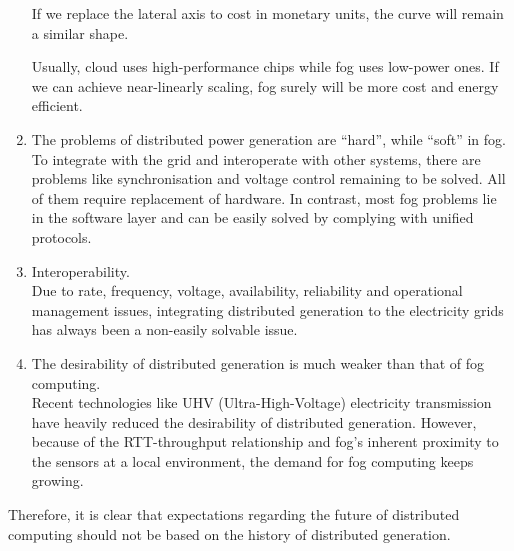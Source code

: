 \begin{enumerate}
	If we replace the lateral axis to cost in monetary units, the curve will remain a similar shape. 
	
	Usually, cloud uses high-performance chips while fog uses low-power ones. If we can achieve near-linearly scaling, fog surely will be more cost and energy efficient. 
	
	\item The problems of distributed power generation are ``hard'', while ``soft'' in fog.\\
	To integrate with the grid and interoperate with other systems, there are problems like synchronisation and voltage control remaining to be solved. All of them require replacement of hardware. In contrast, most fog problems lie in the software layer and can be easily solved by complying with unified protocols. 	
	\item Interoperability.\\
	Due to rate, frequency, voltage, availability, reliability and operational management issues, integrating distributed generation to the electricity grids has always been a non-easily solvable issue.  
	\item The desirability of distributed generation is much weaker than that of fog computing.\\
	Recent technologies like UHV (Ultra-High-Voltage) electricity transmission have heavily reduced the desirability of distributed generation. However, because of the RTT-throughput relationship and fog's inherent proximity to the sensors at a local environment, the demand for fog computing keeps growing. 
	
\end{enumerate}

Therefore, it is clear that expectations regarding the future of distributed computing should not be based on the history of distributed generation.  

